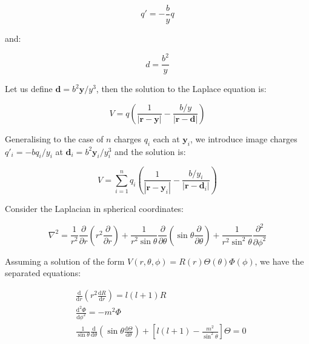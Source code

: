 \documentclass[12pt]{article}
\begin{document}
\begin{equation}
    q' = -\frac{b}{y} q
\end{equation}

and:

\begin{equation}
    d = \frac{b^{2}}{y}
\end{equation}

Let us define $\mathbf{d} = b^{2} \mathbf{y}/y^{3}$, then the solution to the Laplace equation is:

\begin{equation}
    V = q \left( \frac{1}{\left\lvert \mathbf{r} - \mathbf{y} \right\rvert} - \frac{b/y}{\left\lvert \mathbf{r} - \mathbf{d} \right\rvert} \right)
\end{equation}

Generalising to the case of $n$ charges $q_{i}$ each at $\mathbf{y}_{i}$, we introduce image charges $q'_{i} = -bq_{i}/y_{i}$ at $\mathbf{d}_{i} = b^{2} \mathbf{y}_{i}/y_{i}^{3}$ and the solution is:

\begin{equation}
    V = \sum_{i = 1}^{n} q_{i} \left( \frac{1}{\left\lvert \mathbf{r} - \mathbf{y}_{i} \right\rvert} - \frac{b/y_{i}}{\left\lvert \mathbf{r} - \mathbf{d}_{i} \right\rvert} \right)
\end{equation}

Consider the Laplacian in spherical coordinates:

\begin{equation}
    \nabla^{2} = \frac{1}{r^{2}} \frac{\partial}{\partial r} \left( r^{2} \frac{\partial}{\partial r} \right) + \frac{1}{r^{2} \sin{\theta}} \frac{\partial}{\partial \theta} \left( \sin{\theta} \frac{\partial}{\partial \theta} \right) + \frac{1}{r^{2} \sin^{2}{\theta}} \frac{\partial^{2}}{\partial \phi^{2}}
\end{equation}

Assuming a solution of the form $V(r, \theta, \phi) = R(r) \Theta(\theta) \Phi(\phi)$, we have the separated equations:

\begin{equation}
\begin{split}
    &\frac{\mathrm{d}}{\mathrm{d}r} \left( r^2 \frac{\mathrm{d}R}{\mathrm{d}r} \right) = l(l+1)R \\
    &\frac{\mathrm{d}^{2} \Phi}{\mathrm{d} \phi^2} = -m^2 \Phi \\
    &\frac{1}{\sin{\theta}} \frac{\mathrm{d}}{\mathrm{d} \theta} \left( \sin{\theta} \frac{\mathrm{d} \Theta}{\mathrm{d} \theta} \right) + \left[ l(l+1) - \frac{m^2}{\sin^{2}{\theta}} \right] \Theta = 0
\end{split}
\end{equation}
\end{document}
